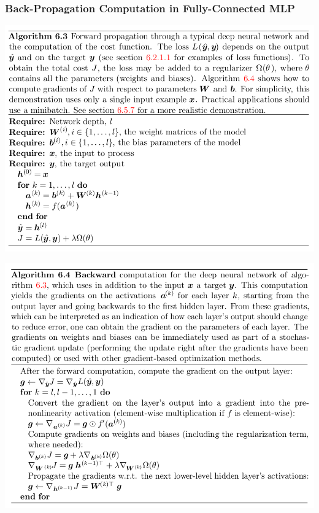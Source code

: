 \documentclass[11pt]{article}
\begin{document}
\subsubsection{Back-Propagation Computation in Fully-Connected MLP}
\label{sec:org60a1b2c}
\begin{center}
\includegraphics[width=.9\linewidth]{Deep Feedforward Networks/screenshot_2018-10-02_08-22-46.png}
\end{center}

\begin{center}
\includegraphics[width=.9\linewidth]{Deep Feedforward Networks/screenshot_2018-10-02_08-23-03.png}
\end{center}
\end{document}
